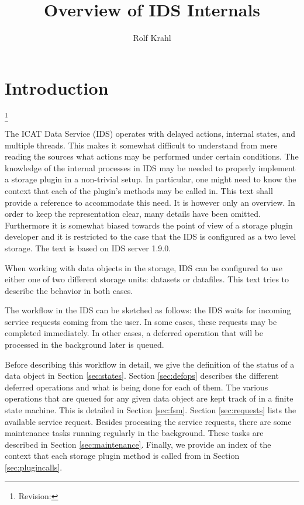 \documentclass[paper=a4]{scrartcl}
\title{Overview of IDS Internals}
\author{Rolf Krahl}
\newcommand{\revhint}{%
  \begingroup%
  \let\thefootnote\relax%
  \footnote{Revision: }%
  \addtocounter{footnote}{-1}%
  \endgroup%
}
\begin{document}
\maketitle

\section{Introduction}

\revhint{}%
The ICAT Data Service (IDS) operates with delayed actions, internal
states, and multiple threads.  This makes it somewhat difficult to
understand from mere reading the sources what actions may be performed
under certain conditions.  The knowledge of the internal processes in
IDS may be needed to properly implement a storage plugin in a
non-trivial setup.  In particular, one might need to know the context
that each of the plugin's methods may be called in.  This text shall
provide a reference to accommodate this need.  It is however only an
overview.  In order to keep the representation clear, many details
have been omitted.  Furthermore it is somewhat biased towards the
point of view of a storage plugin developer and it is restricted to
the case that the IDS is configured as a two level storage.  The text
is based on IDS server 1.9.0.

When working with data objects in the storage, IDS can be configured
to use either one of two different storage units: datasets or
datafiles.  This text tries to describe the behavior in both cases.

The workflow in the IDS can be sketched as follows: the IDS waits for
incoming service requests coming from the user.  In some cases, these
requests may be completed immediately.  In other cases, a deferred
operation that will be processed in the background later is queued.

Before describing this workflow in detail, we give the definition of
the status of a data object in Section \ref{sec:states}.  Section
\ref{sec:defops} describes the different deferred operations and what
is being done for each of them.  The various operations that are
queued for any given data object are kept track of in a finite state
machine.  This is detailed in Section \ref{sec:fsm}.  Section
\ref{sec:requests} lists the available service request.  Besides
processing the service requests, there are some maintenance tasks
running regularly in the background.  These tasks are described in
Section \ref{sec:maintenance}.  Finally, we provide an index of the
context that each storage plugin method is called from in Section
\ref{sec:plugincalls}.
\end{document}
